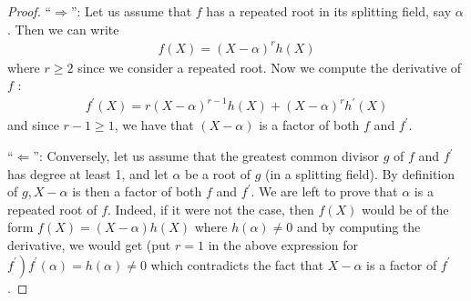 \documentclass{article}
\begin{document}
\begin{proof}
``$\Rightarrow$'':
Let us assume that $f$ has a repeated root in its splitting field, say $\alpha$. Then we can write
\begin{align*}
f(X)=(X-\alpha)^{r} h(X)
\end{align*}
where $r \geq 2$ since we consider a repeated root. Now we compute the derivative of $f$ :
\begin{align*}
f^{\prime}(X)=r(X-\alpha)^{r-1} h(X)+(X-\alpha)^{r} h^{\prime}(X)
\end{align*}
and since $r-1 \geq 1$, we have that $(X-\alpha)$ is a factor of both $f$ and $f^{\prime}$.

``$\Leftarrow$'':
Conversely, let us assume that the greatest common divisor $g$ of $f$ and $f^{\prime}$ has degree at least 1, and let $\alpha$ be a root of $g$ (in a splitting field). By definition of $g, X-\alpha$ is then a factor of both $f$ and $f^{\prime}$. We are left to prove that $\alpha$ is a repeated root of $f$. Indeed, if it were not the case, then $f(X)$ would be of the form $f(X)=(X-\alpha) h(X)$ where $h(\alpha) \neq 0$ and by computing the derivative, we would get (put $r=1$ in the above expression for $\left.f^{\prime}\right) f^{\prime}(\alpha)=h(\alpha) \neq 0$ which contradicts the fact that $X-\alpha$ is a factor of $f^{\prime}$.
\end{proof}
\end{document}
